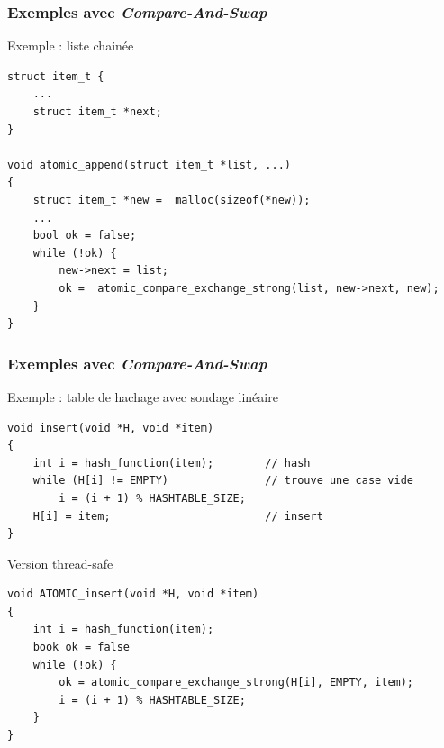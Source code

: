 \documentclass[xcolor={x11names,svgnames},x11names,svgnames]{beamer}
\begin{document}
\begin{frame}[fragile, label=CAS_list]
  \frametitle{Exemples avec \emph{Compare-And-Swap}}

  \begin{exampleblock}{Exemple : liste chainée}
\begin{verbatim}
struct item_t {
    ...
    struct item_t *next;
}

void atomic_append(struct item_t *list, ...)
{
    struct item_t *new =  malloc(sizeof(*new));
    ...
    bool ok = false;
    while (!ok) {
        new->next = list;
        ok =  atomic_compare_exchange_strong(list, new->next, new);
    }
}
\end{verbatim}
    \end{exampleblock}
\end{frame}


\begin{frame}[fragile, label=CAS_hash]
  \frametitle{Exemples avec \emph{Compare-And-Swap}}

  \begin{exampleblock}{Exemple : table de hachage avec sondage linéaire}
\begin{verbatim}
void insert(void *H, void *item)
{
    int i = hash_function(item);        // hash
    while (H[i] != EMPTY)               // trouve une case vide
        i = (i + 1) % HASHTABLE_SIZE;        
    H[i] = item;                        // insert
}
\end{verbatim}
  \end{exampleblock}

\medskip
  
  \begin{alertblock}{Version thread-safe}
\begin{verbatim}
void ATOMIC_insert(void *H, void *item)
{
    int i = hash_function(item);
    book ok = false
    while (!ok) {
        ok = atomic_compare_exchange_strong(H[i], EMPTY, item);
        i = (i + 1) % HASHTABLE_SIZE;        
    }
}
\end{verbatim}
  \end{alertblock}
\end{frame}

\end{document}
